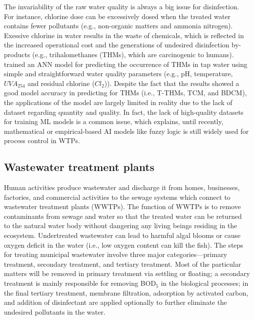 The invariability of the raw water quality is always a big issue for disinfection. For instance, chlorine dose can be excessively dosed when the treated water contains fewer pollutants (e.g., non-organic matters and ammonia nitrogen). Exessive chlorine in water results in the waste of chemicals, which is reflected in the increased operational cost and the generations of undesired disinfection by-products (e.g., trihalomethanes (THMs), which are carcinogenic to humans). \citet{xuUsingSimpleEasy2022} trained an ANN model for predicting the occurrence of THMs in tap water using simple and straightforward water quality parameters (e.g., pH, temperature, $UVA_{254}$ and residual chlorine ($Cl_{2}$)). Despite the fact that the results showed a good model accuracy in predicting for THMs (i.e., T-THMs, TCM, and BDCM), the applications of the model are largely limited in reality due to the lack of dataset regarding quantity and quality. In fact, the lack of high-quality datasets for training ML models is a common issue, which explains, until recently, mathematical or empirical-based AI models like fuzzy logic \citep{gamizFuzzyGainScheduling2020,godo-plaControlPrimaryDisinfection2021} is still widely used for process control in WTPs.

\subsection{Wastewater treatment plants}
Human activities produce wastewater and discharge it from homes, businesses, factories, and commercial activities to the sewage systems which connect to wastewater treatment plants (WWTPs). The function of  WWTPs is to remove contaminants from sewage and water so that the treated water can be returned to the natural water body without dangering any living beings residing in the ecosystem. Undertreated wastewater can lead to harmful algal blooms or cause oxygen deficit in the water (i.e., low oxygen content can kill the fish). The steps for treating municipal wastewater involve three major categories---primary treatment, secondary treatment, and tertiary treatment. Most of the particular matters will be removed in primary treatment via settling or floating; a secondary treatment is mainly responsible for removing BOD$_5$ in the biological processes; in the final tertiary treatment, membrane filtration, adsorption by activated carbon, and addition of disinfectant are applied optionally to further eliminate the undesired pollutants in the water.

